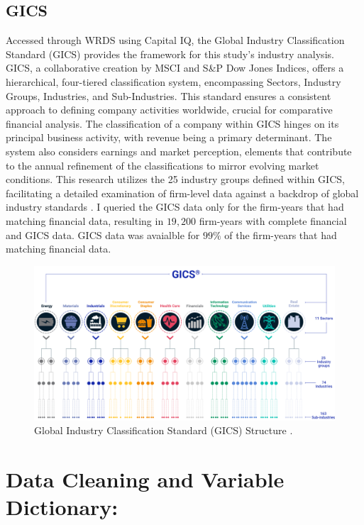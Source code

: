  \subsection{GICS}
 Accessed through WRDS using Capital IQ, the Global Industry Classification Standard (GICS) provides the framework for this study's industry analysis. GICS, a collaborative creation by MSCI and S\&P Dow Jones Indices, offers a hierarchical, four-tiered classification system, encompassing Sectors, Industry Groups, Industries, and Sub-Industries. This standard ensures a consistent approach to defining company activities worldwide, crucial for comparative financial analysis. The classification of a company within GICS hinges on its principal business activity, with revenue being a primary determinant. The system also considers earnings and market perception, elements that contribute to the annual refinement of the classifications to mirror evolving market conditions. This research utilizes the 25 industry groups defined within GICS, facilitating a detailed examination of firm-level data against a backdrop of global industry standards \cite{GICS_MSCI, GICS_Wikipedia}. I queried the GICS data only for the firm-years that had matching financial data, resulting in $19,200$ firm-years with complete financial and GICS data. GICS data was avaialble for $99\%$ of the firm-years that had matching financial data.
 
\begin{figure}[H]
\begin{center}
\includegraphics[width=5in]{figures/gics.png}
\caption{Global Industry Classification Standard (GICS) Structure \cite{GICS_MSCI}.}
\label{fig:label1}
\end{center}
\end{figure}

\section{Data Cleaning and Variable Dictionary:}

